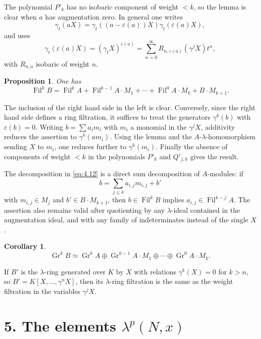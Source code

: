 \documentclass[11pt]{article}
\theoremstyle{plain}
\newtheorem{proposition}[theorem]{Proposition}
\newtheorem{corollary}[theorem]{Corollary}
\theoremstyle{definition}
\theoremstyle{remark}
\DeclareMathOperator{\Gr}{Gr}
\providecommand{\Fil}{\operatorname{Fil}}
\begin{document}
The polynomial $P'_k$ has no isobaric component of weight $<k$, so the lemma is clear when $a$ has augmentation zero. In general one writes
\[
\gamma_t(aX)=\gamma_t((a-\varepsilon(a))X)\gamma_t(\varepsilon(a)X),
\]
and uses
\[
\gamma_t(\varepsilon(a)X)=(\gamma_tX)^{\varepsilon(a)}=\sum_{n=0}^{\infty}R_{n,\varepsilon(a)}(\gamma^jX)t^n,
\]
with $R_{n,a}$ isobaric of weight $n$.

\begin{proposition}\label{prop:4.12}
One has
\begin{equation}\label{eq:4.12}
\Fil^kB=\Fil^kA+\Fil^{k-1}A\cdot M_1+\cdots+\Fil^0A\cdot M_k+B\cdot M_{k+1}.
\end{equation}
\end{proposition}

The inclusion of the right hand side in the left is clear. Conversely, since the right hand side defines a ring filtration, it suffices to treat the generators $\gamma^k(b)$ with $\varepsilon(b)=0$. Writing $b=\sum a_im_i$ with $m_i$ a monomial in the $\gamma^jX$, additivity reduces the assertion to $\gamma^k(am_i)$. Using the lemma and the $A$-$\lambda$-homomorphism sending $X$ to $m_i$, one reduces further to $\gamma^k(m_i)$. Finally the absence of components of weight $<k$ in the polynomials $P'_k$ and $Q'_{j,k}$ gives the result.

The decomposition in \eqref{eq:4.12} is a direct sum decomposition of $A$-modules: if
\[
b=\sum_{j\leq k}a_{i,j}m_{i,j}+b'
\]
with $m_{i,j}\in M_j$ and $b'\in B\cdot M_{k+1}$, then $b\in\Fil^kB$ implies $a_{i,j}\in\Fil^{k-j}A$. The assertion also remains valid after quotienting by any $\lambda$-ideal contained in the augmentation ideal, and with any family of indeterminates instead of the single $X$.

\begin{corollary}
\[
\Gr^kB\simeq \Gr^kA\oplus \Gr^{k-1}A\cdot M_1\oplus\cdots\oplus\Gr^0A\cdot M_k.
\]
\end{corollary}

If $B'$ is the $\lambda$-ring generated over $K$ by $X$ with relations $\gamma^k(X)=0$ for $k>n$, so $B'=K[X,\ldots,\gamma^nX]$, then its $\lambda$-ring filtration is the same as the weight filtration in the variables $\gamma^jX$.

\section*{5. The elements $\lambda^p(N,x)$}
\end{document}
